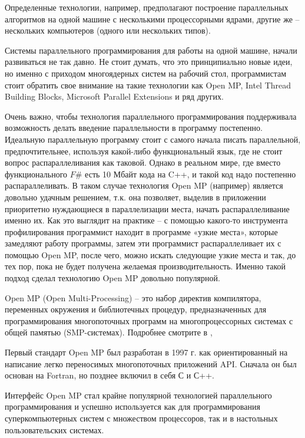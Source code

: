 \documentclass[a4paper, 14pt]{extreport}
\begin{document}
	Определенные технологии, например, предполагают построение параллельных алгоритмов на одной машине с несколькими процессорными ядрами, другие же – нескольких компьютеров (одного или нескольких типов). 
	
	Системы параллельного программирования для работы на одной машине, начали развиваться не так давно. Не стоит думать, что это принципиально новые идеи, но именно с приходом многоядерных систем на рабочий стол, программистам стоит обратить свое внимание на такие технологии как Open MP, Intel Thread Building Blocks, Microsoft Parallel Extensions и ряд других.
	
	Очень важно, чтобы технология параллельного программирования поддерживала возможность делать введение параллельности в программу постепенно. Идеальную параллельную программу стоит с самого начала писать параллельной, предпочтительнее, используя какой-либо функциональный язык, где не стоит вопрос распараллеливания как таковой. Однако в реальном мире, где вместо функционального $F\#$ есть 10 Мбайт кода на C++, и такой код надо постепенно распараллеливать. В таком случае технология Open MP (например) является довольно удачным решением, т.к. она позволяет, выделив в приложении приоритетно нуждающиеся в параллелизации места, начать распараллеливание именно их. Как это выглядит на практике – с помощью какого-то инструмента профилирования программист находит в программе «узкие места», которые замедляют работу программы, затем эти программист распараллеливает их с помощью Open MP, после чего, можно искать следующие узкие места и так, до тех пор, пока не будет получена желаемая производительность. Именно такой подход сделал технологию Open MP довольно популярной.
	
	Open MP (Open Multi-Processing) – это набор директив компилятора, переменных окружения и библиотечных процедур, предназначенных для программирования многопоточных программ на многопроцессорных системах с общей памятью (SMP-системах).
Подробнее смотрите в \citealp{fpmi}, \citealp{anton}
	
	Первый стандарт Open MP был разработан в 1997 г. как ориентированный на написание легко переносимых многопоточных приложений API. Сначала он был основан на Fortran, но позднее включил в себя С и С++.
	
	Интерфейс Open MP стал крайне популярной технологией параллельного программирования и успешно используется как для программирования суперкомпьютерных систем с множеством процессоров, так и в настольных пользовательских системах.
	
\end{document}
